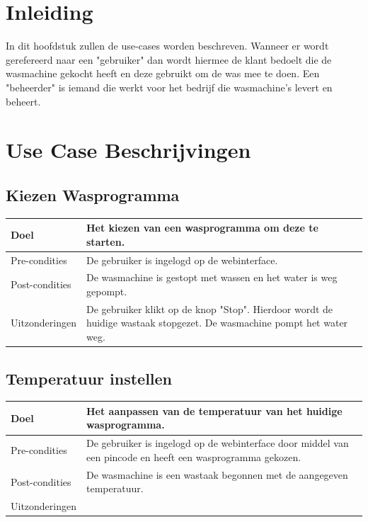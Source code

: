 \section{Inleiding}
In dit hoofdstuk zullen de use-cases worden beschreven.
Wanneer er wordt gerefereerd naar een "gebruiker" dan wordt hiermee de klant bedoelt die de wasmachine gekocht heeft en deze gebruikt om de was mee te doen.
Een "beheerder" is iemand die werkt voor het bedrijf die wasmachine's levert en beheert.
\newpage
\section{Use Case Beschrijvingen}
\subsection{Kiezen Wasprogramma}
\begin{center}
  \begin{tabular}{ | p{4cm} | p{8.5cm} | }    \hline
    Doel & Het kiezen van een wasprogramma om deze te starten. \\ \hline
    Pre-condities & De gebruiker is ingelogd op de webinterface. \\ \hline
    Post-condities & De wasmachine is gestopt met wassen en het water is weg gepompt. \\ \hline
    Uitzonderingen & De gebruiker klikt op de knop "Stop". Hierdoor wordt de huidige wastaak stopgezet. De wasmachine pompt het water weg. \\
    \hline
  \end{tabular}
\end{center}

\subsection{Temperatuur instellen}
\begin{center}
  \begin{tabular}{ | p{4cm} | p{8.5cm} | }    \hline
    Doel & Het aanpassen van de temperatuur van het huidige wasprogramma. \\ \hline
    Pre-condities & De gebruiker is ingelogd op de webinterface door middel van een pincode en heeft een wasprogramma gekozen. \\ \hline
    Post-condities & De wasmachine is een wastaak begonnen met de aangegeven temperatuur. \\ \hline
    Uitzonderingen &  \\
    \hline
  \end{tabular}
\end{center}

